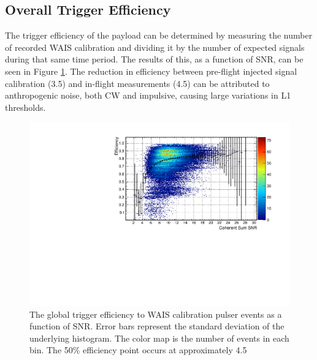 		
		
	\subsection{Overall Trigger Efficiency}
		The trigger efficiency of the payload can be determined by measuring the number of recorded WAIS calibration and dividing it by the number of expected signals during that same time period.  The results of this, as a function of SNR, can be seen in Figure \ref{fig:waisEfficiency}.  The reduction in efficiency between pre-flight injected signal calibration (3.5) and in-flight measurements (4.5) can be attributed to anthropogenic noise, both CW and impulsive, causing large variations in L1 thresholds.

\begin{figure}
	\centering
	\includegraphics[width=\textwidth]{figures/waisEfficiency}
	\caption{The global trigger efficiency to WAIS calibration pulser events as a function of SNR.  Error bars represent the standard deviation of the underlying histogram.  The color map is the number of events in each bin.  The 50\% efficiency point occurs at approximately 4.5}
	\label{fig:waisEfficiency}
\end{figure}	
		



